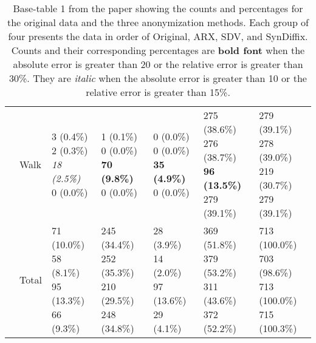 \documentclass[10pt]{article}
\begin{document}
\begin{table}
\begin{center}
\begin{small}
\begin{tabular}{lllllll}
& Walk      &  \makecell[l]{\textnormal{3 (0.4\%)} \\\textnormal{2 (0.3\%)} \\\textit{18 (2.5\%)} \\\textnormal{0 (0.0\%)}}      &  \makecell[l]{\textnormal{1 (0.1\%)} \\\textnormal{0 (0.0\%)} \\\textbf{70 (9.8\%)} \\\textnormal{0 (0.0\%)}}      &  \makecell[l]{\textnormal{0 (0.0\%)} \\\textnormal{0 (0.0\%)} \\\textbf{35 (4.9\%)} \\\textnormal{0 (0.0\%)}}      &  \makecell[l]{\textnormal{275 (38.6\%)} \\\textnormal{276 (38.7\%)} \\\textbf{96 (13.5\%)} \\\textnormal{279 (39.1\%)}}      & \makecell[l]{279 (39.1\%) \\278 (39.0\%) \\219 (30.7\%) \\279 (39.1\%) \\} \\ \cline{2-7}
& Total      & \makecell[l]{71 (10.0\%) \\58 (8.1\%) \\95 (13.3\%) \\66 (9.3\%) \\}      & \makecell[l]{245 (34.4\%) \\252 (35.3\%) \\210 (29.5\%) \\248 (34.8\%) \\}      & \makecell[l]{28 (3.9\%) \\14 (2.0\%) \\97 (13.6\%) \\29 (4.1\%) \\}      & \makecell[l]{369 (51.8\%) \\379 (53.2\%) \\311 (43.6\%) \\372 (52.2\%) \\}      & \makecell[l]{713 (100.0\%)  \\703 (98.6\%)  \\713 (100.0\%)  \\715 (100.3\%)  \\} \\ 

      \bottomrule
      \end{tabular}
      \end{small}
      \caption{Base-table 1 from the paper showing the counts and percentages for the original data and the three anonymization methods. Each group of four presents the data in order of Original, ARX, SDV, and SynDiffix. Counts and their corresponding percentages are \textbf{bold font} when the absolute error is greater than 20 or the relative error is greater than 30\%. They are \textit{italic} when the absolute error is greater than 10 or the relative error is greater than 15\%.}
      \label{tab:table1}
      \end{center}
      \end{table}
\end{document}
